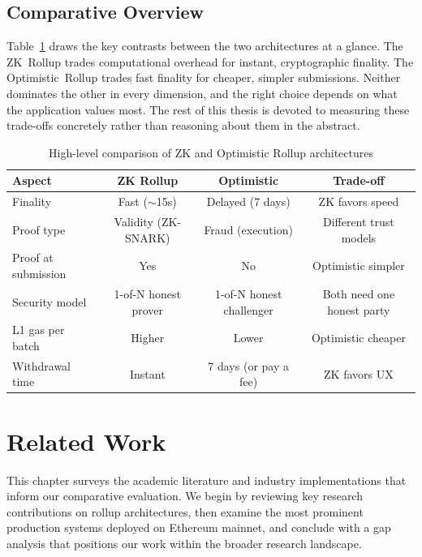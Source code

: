 \documentclass[
]{elteikthesis}[2024/04/26]
\begin{document}
\section{Comparative Overview}

Table~\ref{tab:comparison-overview} draws the key contrasts between the two architectures at a glance. The ZK~Rollup trades computational overhead for instant, cryptographic finality. The Optimistic~Rollup trades fast finality for cheaper, simpler submissions. Neither dominates the other in every dimension, and the right choice depends on what the application values most. The rest of this thesis is devoted to measuring these trade-offs concretely rather than reasoning about them in the abstract.

\begin{table}[h]
    \centering
    \begin{tabular}{l|c|c|c}
        \hline
        \textbf{Aspect} & \textbf{ZK Rollup} & \textbf{Optimistic} & \textbf{Trade-off} \\
        \hline
        Finality & Fast ($\sim$15s) & Delayed (7 days) & ZK favors speed \\
        \hline
        Proof type & Validity (ZK-SNARK) & Fraud (execution) & Different trust models \\
        \hline
        Proof at submission & Yes & No & Optimistic simpler \\
        \hline
        Security model & 1-of-N honest prover & 1-of-N honest challenger & Both need one honest party \\
        \hline
        L1 gas per batch & Higher & Lower & Optimistic cheaper \\
        \hline
        Withdrawal time & Instant & 7 days (or pay a fee) & ZK favors UX \\
        \hline
    \end{tabular}
    \caption{High-level comparison of ZK and Optimistic Rollup architectures}
    \label{tab:comparison-overview}
\end{table}

\cleardoublepage

\chapter{Related Work}
\label{ch:relatedwork}

This chapter surveys the academic literature and industry implementations that inform our comparative evaluation. We begin by reviewing key research contributions on rollup architectures, then examine the most prominent production systems deployed on Ethereum mainnet, and conclude with a gap analysis that positions our work within the broader research landscape.
\end{document}
